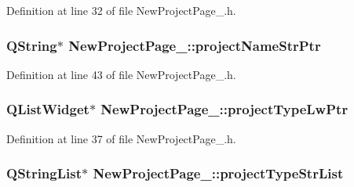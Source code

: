 Definition at line 32 of file New\-Project\-Page\-\_.\-h.

\hypertarget{class_new_project_page__2_ad3fb4b5248b01e40660cbb91ebd215c9}{
\subsubsection[{project\-Name\-Str\-Ptr}]{\setlength{\rightskip}{0pt plus 5cm}Q\-String$\ast$ New\-Project\-Page\-\_\-::project\-Name\-Str\-Ptr\hspace{0.3cm}{\ttfamily [private]}}}\label{class_new_project_page__2_ad3fb4b5248b01e40660cbb91ebd215c9}


Definition at line 43 of file New\-Project\-Page\-\_.\-h.

\hypertarget{class_new_project_page__2_aca414e3a3ca361ef6b24d6f849bc1bca}{
\subsubsection[{project\-Type\-Lw\-Ptr}]{\setlength{\rightskip}{0pt plus 5cm}Q\-List\-Widget$\ast$ New\-Project\-Page\-\_\-::project\-Type\-Lw\-Ptr\hspace{0.3cm}{\ttfamily [private]}}}\label{class_new_project_page__2_aca414e3a3ca361ef6b24d6f849bc1bca}


Definition at line 37 of file New\-Project\-Page\-\_.\-h.

\hypertarget{class_new_project_page__2_a1206183c60275d0189a9a1ec78d3ad2b}{
\subsubsection[{project\-Type\-Str\-List}]{\setlength{\rightskip}{0pt plus 5cm}Q\-String\-List$\ast$ New\-Project\-Page\-\_\-::project\-Type\-Str\-List\hspace{0.3cm}{\ttfamily [private]}}}\label{class_new_project_page__2_a1206183c60275d0189a9a1ec78d3ad2b}


